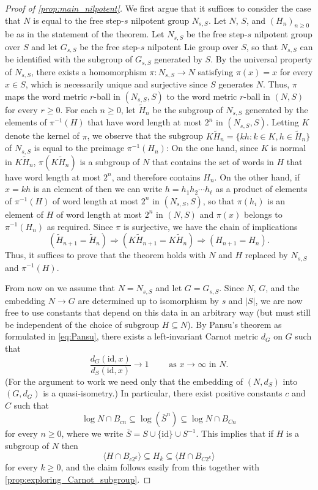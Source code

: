 \documentclass[11pt]{article}
\numberwithin{equation}{section}
\theoremstyle{plain}
\theoremstyle{definition}
\theoremstyle{remark}
\numberwithin{equation}{section}
\numberwithin{equation}{section}
\begin{document}
\begin{proof}[Proof of \cref{prop:main_nilpotent}]
We first argue that it suffices to consider the case that $N$ is equal to the free step-$s$ nilpotent group $N_{s,S}$.
Let $N$, $S$, and $(H_n)_{n\geq 0}$ be as in the statement of the theorem. Let $N_{s,S}$ be the free step-$s$ nilpotent group over $S$ and let $G_{s,S}$ be the free step-$s$ nilpotent Lie group over $S$, so that $N_{s,S}$ can be identified with the subgroup of $G_{s,S}$ generated by $S$. By the universal property of $N_{s,S}$, there exists a homomorphism $\pi:N_{s,S}\to N$ satisfying $\pi(x)=x$ for every $x\in S$, which is necessarily unique and surjective since $S$ generates $N$. Thus, $\pi$ maps the word metric $r$-ball in $(N_{s,S},S)$ to the word metric $r$-ball in $(N,S)$ for every $r\geq 0$.
For each $n \geq 0$, let $\tilde H_n$ be the subgroup of $N_{s,S}$ generated by the elements of $\pi^{-1}(H)$ that have word length at most $2^n$ in $(N_{s,S},S)$. Letting $K$ denote the kernel of $\pi$, we observe that the subgroup $K\tilde H_n=\{kh:k\in K, h\in \tilde H_n\}$ of $N_{s,S}$ is equal to the preimage $\pi^{-1}(H_n)$: On the one hand, since $K$ is normal in $K \tilde H_n$, $\pi(K \tilde H_n)$ is a subgroup of $N$ that contains the set of words in $H$ that have word length at most $2^n$, and therefore contains $H_n$. On the other hand, if $x=kh$ is an element of then we can write $h=h_1 h_2\cdots h_\ell$ as a product of elements of $\pi^{-1}(H)$ of word length at most $2^n$ in $(N_{s,S},S)$, so that $\pi(h_i)$ is an element of $H$ of word length at most $2^n$ in $(N,S)$ and $\pi(x)$ belongs to $\pi^{-1}(H_n)$ as required. 
%
%
 Since $\pi$ is surjective, we have the chain of implications
 \[
(\tilde H_{n+1}=\tilde H_n) \Rightarrow (K \tilde H_{n+1}=K\tilde H_n) \Rightarrow (H_{n+1}=H_n).
 \]
 Thus, it suffices to prove that the theorem holds with $N$ and $H$ replaced by $N_{s,S}$ and $\pi^{-1}(H)$.

\medskip

From now on we assume that $N=N_{s,S}$ and let $G=G_{s,S}$. Since $N$, $G$, and the embedding $N\to G$ are determined up to isomorphism by $s$ and $|S|$, we are now free to use constants that depend on this data in an arbitrary way (but must still be independent of the choice of subgroup $H \subseteq N$). 
By Pansu's theorem as formulated in \eqref{eq:Pansu}, there exists a left-invariant Carnot metric $d_G$ on $G$ such that 
\[
\frac{d_G(\mathrm{id},x)}{d_S(\mathrm{id},x)} \to 1 \qquad \text{ as $x\to\infty$ in $N$.}
\]
(For the argument to work we need only that the embedding of $(N,d_S)$ into $(G,d_G)$ is a quasi-isometry.)
In particular, there exist positive constants $c$ and $C$ such that
\[
\log N \cap B_{cn} \subseteq \log (\overline{S}^n) \subseteq \log N \cap B_{Cn}
\]
for every $n\geq 0$, where we write $\overline{S}=S\cup\{\mathrm{id}\}\cup S^{-1}$. This implies that if $H$ is a subgroup of $N$ then
\[
\langle H \cap B_{c2^k} \rangle \subseteq H_k \subseteq \langle H \cap B_{C2^k} \rangle
\]
for every $k \geq 0$, and the claim follows easily from this together with \cref{prop:exploring_Carnot_subgroup}. \qedhere

\end{proof}
\end{document}
